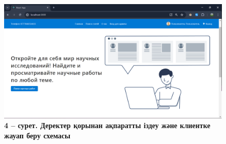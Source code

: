 \begin{figure}[H]
	\centering
	\includegraphics[width=1\textwidth]{assets/145}
	\caption*{\bfseries 4 -- сурет. Деректер қорынан ақпаратты іздеу және клиентке жауап
  беру схемасы}
\end{figure}

